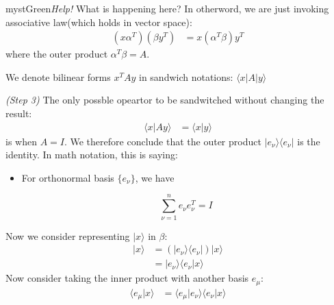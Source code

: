 \begin{mystadmonition}{mystGreen}{\emph{Help!} What is happening here?}
In otherword, we are just invoking associative law(which holds in vector space):
\begin{equation}
\begin{aligned}
(x\alpha^T) (\beta y^T)&=x(\alpha^T \beta) y^T
\end{aligned}
\end{equation}
where the outer product $\alpha^T \beta=A$.

We denote bilinear forms $x^TAy$ in sandwich notations: $\langle x |A|y\rangle$

\textit{(Step 3)} The only possble opeartor to be sandwitched without changing the result:
\begin{equation}
\begin{aligned}
\langle x|Ay\rangle &= \langle x | y\rangle
\end{aligned}
\end{equation}
is when $A=I$. We therefore conclude that the outer product $|e_{\nu}\rangle \langle e_{\nu}|$ is the identity. In math notation, this is saying:

\begin{itemize}
\item For orthonormal basis $\{e_{\nu}\}$, we have

\begin{equation}
\sum_{\nu=1}^n e_{\nu}e_{\nu}^T=I
\end{equation}
\end{itemize}

\end{mystadmonition}
Now we consider representing $|x\rangle$ in $\beta$:
\begin{equation}
\begin{aligned}
|x\rangle &= (|e_{\nu} \rangle \langle e_{\nu}|) |x\rangle \\
&= |e_{\nu}\rangle \langle e_{\nu}|x\rangle
\end{aligned}
\end{equation}
Now consider taking the inner product with another basis $e_{\mu}$:
\begin{equation}
\begin{aligned}
\langle e_{\mu}|x\rangle  &=\langle e_{\mu}|e_{\nu}\rangle \langle e_{\nu}|x\rangle
\end{aligned}
\end{equation}